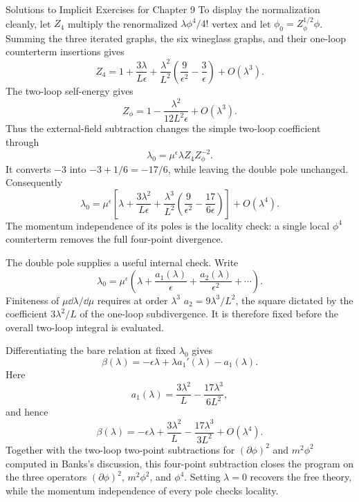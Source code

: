 \begin{bankssolutions}{Solutions to Implicit Exercises for Chapter 9}
To display the normalization cleanly, let $Z_4$ multiply the renormalized
$\lambda\phi^4/4!$ vertex and let
$\phi_0=Z_\phi^{1/2}\phi$.  Summing the three iterated graphs, the six
wineglass graphs, and their one-loop counterterm insertions gives
\[
  Z_4=1+\frac{3\lambda}{L\epsilon}
  +\frac{\lambda^2}{L^2}
  \left(\frac9{\epsilon^2}-\frac3\epsilon\right)
  +O(\lambda^3).
\]
The two-loop self-energy gives
\[
  Z_\phi=1-\frac{\lambda^2}{12L^2\epsilon}+O(\lambda^3).
\]
Thus the external-field subtraction changes the simple two-loop coefficient
through
\[
  \lambda_0=\mu^\epsilon\lambda Z_4Z_\phi^{-2}.
\]
It converts $-3$ into $-3+1/6=-17/6$, while leaving the double pole unchanged.
Consequently
\[
  \lambda_0=\mu^\epsilon\left[
  \lambda+\frac{3\lambda^2}{L\epsilon}
  +\frac{\lambda^3}{L^2}
  \left(\frac9{\epsilon^2}-\frac{17}{6\epsilon}\right)
  \right]+O(\lambda^4).
\]
The momentum independence of its poles is the locality check: a single local
$\phi^4$ counterterm removes the full four-point divergence.

The double pole supplies a useful internal check.  Write
\[
  \lambda_0=\mu^\epsilon
  \left(\lambda+\frac{a_1(\lambda)}\epsilon
  +\frac{a_2(\lambda)}{\epsilon^2}+\cdots\right).
\]
Finiteness of $\mu\dd\lambda/\dd\mu$ requires at order $\lambda^3$
$a_2=9\lambda^3/L^2$, the square dictated by the coefficient
$3\lambda^2/L$ of the one-loop subdivergence.  It is therefore fixed before
the overall two-loop integral is evaluated.

Differentiating the bare relation at fixed $\lambda_0$ gives
\[
  \beta(\lambda)=-\epsilon\lambda+\lambda a_1'(\lambda)-a_1(\lambda).
\]
Here
\[
  a_1(\lambda)=\frac{3\lambda^2}{L}
  -\frac{17\lambda^3}{6L^2},
\]
and hence
\[
  \beta(\lambda)=-\epsilon\lambda+\frac{3\lambda^2}{L}
  -\frac{17\lambda^3}{3L^2}+O(\lambda^4).
\]
Together with the two-loop two-point subtractions for
$(\partial\phi)^2$ and $m^2\phi^2$ computed in Banks's discussion, this
four-point subtraction closes the program on the three operators
$(\partial\phi)^2$, $m^2\phi^2$, and $\phi^4$.  Setting $\lambda=0$ recovers
the free theory, while the momentum independence of every pole checks
locality.


\end{bankssolutions}
